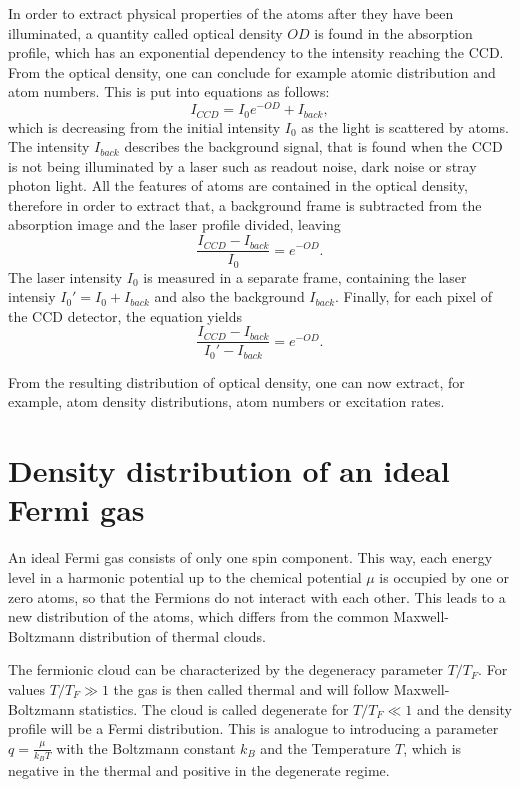 In order to extract physical properties of the atoms after they have been illuminated, a quantity called optical density $OD$ is found in the absorption profile, which has an exponential dependency to the intensity reaching the CCD. From the optical density, one can conclude for example atomic distribution and atom numbers.
This is put into equations as follows:\cite{Murmann2011}
\begin{equation}
I_{CCD} = I_0 e^{-OD} + I_{back},
\end{equation}
which is decreasing from the initial intensity $I_0$ as the light is scattered by atoms. The intensity $I_{back}$ describes the background signal, that is found when the CCD is not being illuminated by a laser such as readout noise, dark noise or stray photon light. All the features of atoms are contained in the optical density, therefore in order to extract that, a background frame is subtracted from the absorption image and the laser profile divided, leaving
\begin{equation}
\frac{I_{CCD} - I_{back}}{I_0} = e^{-OD}.
\end{equation}
The laser intensity $I_0$ is measured in a separate frame, containing the laser intensiy $I_0' = I_0 + I_{back}$ and also the background $I_{back}$. Finally, for each pixel of the CCD detector, the equation yields
\begin{equation}
\frac{I_{CCD} - I_{back}}{I_0' - I_{back}} = e^{-OD}.
\end{equation}

From the resulting distribution of optical density, one can now extract, for example, atom density distributions, atom numbers or excitation rates.

\section{Density distribution of an ideal Fermi gas}
\label{sec:densdistrfermi}

An ideal Fermi gas consists of only one spin component. This way, each energy level in a harmonic potential up to the chemical potential $\mu$ is occupied by one or zero atoms, so that the Fermions do not interact with each other. This leads to a new distribution of the atoms, which differs from the common Maxwell-Boltzmann distribution of thermal clouds.

The fermionic cloud can be characterized by the degeneracy parameter $T/T_F$. For values $T/T_F \gg 1$ the gas is then called thermal and will follow Maxwell-Boltzmann statistics. The cloud is called degenerate for $T/T_F \ll 1$ and the density profile will be a Fermi distribution. This is analogue to introducing a parameter $q=\frac{\mu}{k_BT}$ with the Boltzmann constant $k_B$ and the Temperature $T$, which is negative in the thermal and positive in the degenerate regime.

